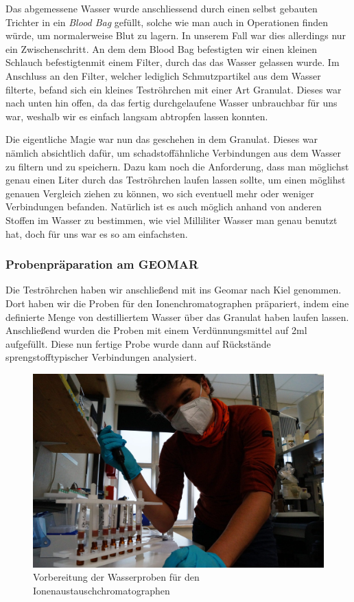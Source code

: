 Das abgemessene Wasser wurde anschliessend durch einen selbst gebauten Trichter in ein \emph{Blood Bag} gefüllt, solche wie man auch in Operationen finden würde, um normalerweise Blut zu lagern. In unserem Fall war dies allerdings nur ein Zwischenschritt. 
An dem dem Blood Bag befestigten wir einen kleinen Schlauch befestigtenmit einem Filter, durch das das Wasser gelassen wurde. Im Anschluss an den Filter, welcher lediglich Schmutzpartikel aus dem Wasser filterte, befand sich ein kleines Teströhrchen mit einer Art Granulat. Dieses war nach unten hin offen, da das fertig durchgelaufene Wasser unbrauchbar für uns war, weshalb wir es einfach langsam abtropfen lassen konnten.

Die eigentliche Magie war nun das geschehen in dem Granulat. Dieses war nämlich absichtlich dafür, um schadstoffähnliche Verbindungen aus dem Wasser zu filtern und zu speichern. Dazu kam noch die Anforderung, dass man möglichst genau einen Liter durch das Teströhrchen laufen lassen sollte, um einen möglihst genauen Vergleich ziehen zu können, wo sich eventuell mehr oder weniger Verbindungen befanden. Natürlich ist es auch möglich anhand von anderen Stoffen im Wasser zu bestimmen, wie viel Milliliter Wasser man genau benutzt hat, doch für uns war es so am einfachsten. 

\subsubsection{Probenpräparation am GEOMAR}
Die Teströhrchen haben wir anschließend mit ins Geomar nach Kiel genommen. Dort haben wir die Proben für den Ionenchromatographen präpariert, indem eine definierte Menge von destilliertem Wasser über das Granulat haben laufen lassen. Anschließend wurden die Proben mit einem Verdünnungsmittel auf 2ml aufgefüllt. Diese nun fertige Probe wurde dann auf Rückstände sprengstofftypischer Verbindungen analysiert.
\begin{figure}[]
    \centering
    \includegraphics[width=0.8\linewidth]{Bilder/DSC05766-scaled.jpg}
    \caption{Vorbereitung der Wasserproben für den Ionenaustauschchromatographen}
    \label{fig:praep}
\end{figure}